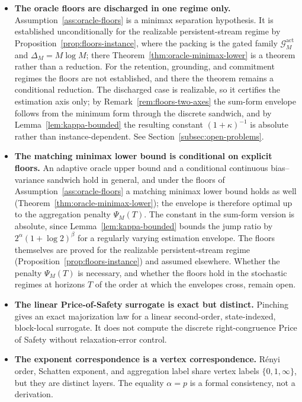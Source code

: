 \documentclass[12pt]{article}
\theoremstyle{definition}
\newcommand{\PsiAgg}{\Psi}
\newcommand{\Gact}{\mathcal G^{\mathrm{act}}}
\begin{document}
\begin{itemize}[leftmargin=1.8em]
\item \textbf{The oracle floors are discharged in one regime only.}
Assumption~\ref{ass:oracle-floors} is a minimax separation hypothesis.  It is
established unconditionally for the realizable persistent-stream regime by
Proposition~\ref{prop:floors-instance}, where the packing is the gated family
$\Gact_M$ and $\Delta_M=M\log M$; there
Theorem~\ref{thm:oracle-minimax-lower} is a theorem rather than a reduction.
For the retention, grounding, and commitment regimes the floors are not
established, and there the theorem remains a conditional reduction.  The
discharged case is realizable, so it certifies the estimation axis only; by
Remark~\ref{rem:floors-two-axes} the sum-form envelope follows from the minimum
form through the discrete sandwich, and by Lemma~\ref{lem:kappa-bounded} the
resulting constant $(1+\kappa)^{-1}$ is absolute rather than
instance-dependent.  See Section~\ref{subsec:open-problems}.

\item \textbf{The matching minimax lower bound is conditional on explicit
floors.}
An adaptive oracle upper bound and a conditional continuous bias--variance
sandwich hold in general, and under the floors of
Assumption~\ref{ass:oracle-floors} a matching minimax lower bound holds as well
(Theorem~\ref{thm:oracle-minimax-lower}); the envelope is therefore optimal up
to the aggregation penalty $\PsiAgg_M(T)$.  The constant in the sum-form
version is absolute, since Lemma~\ref{lem:kappa-bounded} bounds the jump ratio
by $2^\alpha(1+\log2)^\beta$ for a regularly varying estimation envelope.  The
floors themselves are proved for the realizable persistent-stream regime
(Proposition~\ref{prop:floors-instance}) and assumed elsewhere.  Whether the
penalty $\PsiAgg_M(T)$ is necessary, and whether the floors hold in the
stochastic regimes at horizons $T$ of the order at which the envelopes cross,
remain open.

\item \textbf{The linear Price-of-Safety surrogate is exact but distinct.}
Pinching gives an exact majorization law for a linear second-order,
state-indexed, block-local surrogate.  It does not compute the discrete
right-congruence Price of Safety without relaxation-error control.

\item \textbf{The exponent correspondence is a vertex correspondence.}
R\'enyi order, Schatten exponent, and aggregation label share vertex labels
$\{0,1,\infty\}$, but they are distinct layers.  The equality $\alpha=p$ is
a formal consistency, not a derivation.


\end{itemize}
\end{document}
